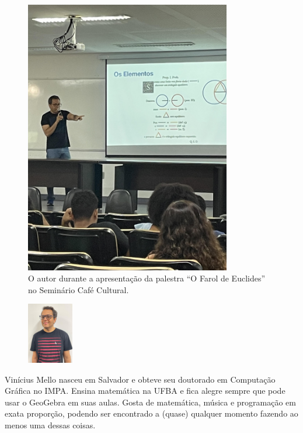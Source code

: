 \documentclass{hipatia}
\begin{document}
\begin{figure}[b!]
\begin{center}
\includegraphics[width=9cm,angle=-90,origin=c]{palestra.jpg}
\end{center}
\caption{\label{fig:Palestra}
O autor durante a apresentação da palestra 
``O Farol de Euclides'' no Seminário 
Café Cultural.}
\end{figure}





\vfill

\begin{figure}
\vspace{-10pt}
  \includegraphics[width=2cm]{Vinicius.jpg}
\end{figure}\noindent
Vinícius Mello nasceu em Salvador e obteve seu doutorado
em Computação Gráfica no IMPA. Ensina matemática 
na UFBA e fica alegre sempre que pode usar o GeoGebra
em suas aulas. Gosta de matemática, música e programação 
em exata proporção, podendo ser encontrado a
(quase) qualquer momento fazendo ao menos uma dessas coisas.
\end{document}
